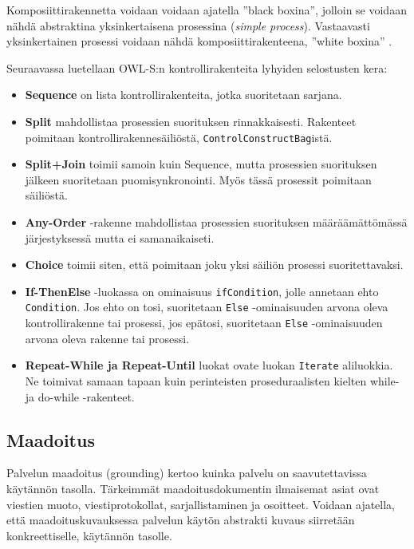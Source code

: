 \documentclass[finnish]{tktltiki2}
\theoremstyle{definition}
\theoremstyle{remark}
\begin{document}
Komposiittirakennetta voidaan voidaan ajatella ''black boxina'', jolloin se voidaan nähdä abstraktina yksinkertaisena prosessina (\textit{simple process}). Vastaavasti yksinkertainen prosessi voidaan nähdä komposiittirakenteena, ''white boxina'' \cite{OWLS}. 

Seuraavassa luetellaan OWL-S:n kontrollirakenteita lyhyiden selostusten kera:      
 
 \begin{itemize}
\item \textbf{Sequence} on lista kontrollirakenteita, jotka suoritetaan sarjana. 
\item \textbf{Split} mahdollistaa prosessien suorituksen rinnakkaisesti. Rakenteet poimitaan kontrollirakennesäiliöstä, \texttt{ControlConstructBag}istä.
\item \textbf{Split+Join} toimii samoin kuin Sequence, mutta prosessien suorituksen jälkeen suoritetaan puomisynkronointi. Myös tässä prosessit poimitaan säiliöstä. 
\item \textbf{Any-Order} -rakenne mahdollistaa prosessien suorituksen määräämättömässä järjestyksessä mutta ei samanaikaiseti. 
\item \textbf{Choice} toimii siten, että poimitaan joku yksi säiliön prosessi suoritettavaksi.
\item \textbf{If-ThenElse} -luokassa on ominaisuus \texttt{ifCondition}, jolle annetaan ehto \texttt{Condition}. Jos ehto on tosi, suoritetaan \texttt{Else} -ominaisuuden arvona oleva kontrollirakenne tai prosessi, jos epätosi, suoritetaan \texttt{Else} -ominaisuuden arvona oleva rakenne tai prosessi. 
\item \textbf{Repeat-While ja Repeat-Until} luokat ovate luokan \texttt{Iterate} aliluokkia. Ne toimivat samaan tapaan kuin perinteisten proseduraalisten kielten while- ja do-while -rakenteet.   
\end{itemize}

\subsection{Maadoitus}

Palvelun maadoitus (grounding) kertoo kuinka palvelu on saavutettavissa käytännön tasolla. Tärkeimmät maadoitusdokumentin ilmaisemat asiat ovat viestien muoto, viestiprotokollat, sarjallistaminen ja osoitteet\cite{OWLS}. Voidaan ajatella, että maadoituskuvauksessa palvelun käytön abstrakti kuvaus siirretään  konkreettiselle, käytännön tasolle\cite{OWLS}. 
\end{document}
